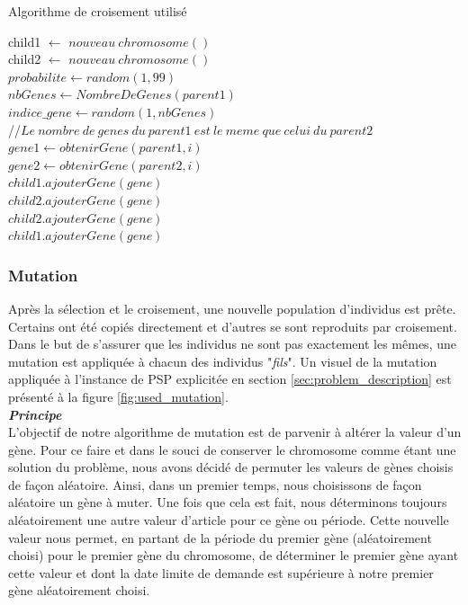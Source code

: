 		\begin{algorithm}[H]
 		\caption{Algorithme de croisement utilisé}
 		\label{alg:cross_over}
 		\BlankLine
 		child1 $\gets$ $nouveau\ chromosome()$ \\
 		child2 $\gets$ $nouveau\ chromosome()$ \\
 		$probabilite \gets random(1,99)$ \\
 		\BlankLine
 		{
 			$nbGenes \gets NombreDeGenes(parent1)$\\
 			$indice\_gene \gets random(1, nbGenes)$\\
 			//$ Le \ nombre \ de \ genes \ du \ parent1 \ est \ le \ meme \ que \ celui \ du \ parent2 $\\
 			{
 				$gene1 \gets obtenirGene(parent1, i)$ \\
 				$gene2 \gets obtenirGene(parent2, i)$ \\
 				{
 					$child1.ajouterGene(gene)$ \\
 					$child2.ajouterGene(gene)$ \\
 				}
 				{
 					$child2.ajouterGene(gene)$ \\
 					$child1.ajouterGene(gene)$ \\
 				}
 			}
 		}
		\end{algorithm}
		  
	\subsubsection{Mutation}
	Après la sélection et le croisement, une nouvelle population d'individus est prête. Certains ont été copiés directement et d'autres se sont reproduits par croisement. Dans le but de s'assurer que les individus ne sont pas exactement les mêmes, une mutation est appliquée à chacun des individus "\emph{fils}". Un visuel de la mutation appliquée à l'instance de PSP explicitée en section \ref{sec:problem_description} est présenté à la figure \ref{fig:used_mutation}.\\
	
	\hspace*{.5cm} \textbf{\textsl{Principe}}\\
	\hspace*{.5cm} L'objectif de notre algorithme de mutation est de parvenir à altérer la valeur d'un gène. Pour ce faire et dans le souci de conserver le chromosome comme étant une solution du problème, nous avons décidé de permuter les valeurs de gènes choisis de façon aléatoire. Ainsi, dans un premier temps, nous choisissons de façon aléatoire un gène à muter. Une fois que cela est fait, nous déterminons toujours aléatoirement une autre valeur d'article pour ce gène ou période. Cette nouvelle valeur nous permet, en partant de la période du premier gène (aléatoirement choisi) pour le premier gène du chromosome, de déterminer le premier gène ayant cette valeur et dont la date limite de demande est supérieure à notre premier gène aléatoirement choisi.
	
